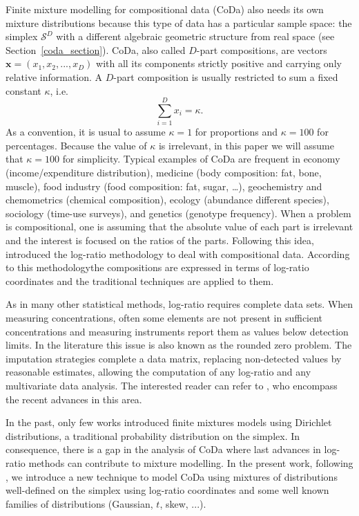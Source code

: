 \documentclass[12pt, a4paper]{article}
\begin{document}
Finite mixture modelling for compositional data (CoDa) also needs its own mixture distributions because this type of data has a particular sample space: the simplex $\mathcal{S}^D$ with a different algebraic geometric structure from real space (see Section~\ref{coda_section}).
CoDa, also called $D$-part compositions, are vectors $\textbf{x} = (x_1, x_2, ..., x_D)$ with all its components strictly positive  and carrying only relative information. A $D$-part composition is usually restricted to sum a fixed constant $\kappa$, i.e.
\begin{equation}
\sum_{i=1 }^D x_i = \kappa.
\label{sum_to_constant}
\end{equation}
As a convention, it is usual to assume $\kappa =1$ for proportions and $\kappa = 100$ for percentages. Because the value of $\kappa$ is irrelevant, in this paper we will assume that $\kappa = 100$ for simplicity. Typical examples of CoDa are frequent in economy (income/expenditure distribution), medicine (body composition: fat, bone, muscle), food industry (food composition: fat, sugar, …), geochemistry and chemometrics (chemical composition), ecology (abundance different species), sociology (time-use surveys), and genetics (genotype frequency). 
When a problem is compositional, one is assuming that the absolute value of each part is irrelevant and the interest is focused on the ratios of the parts. Following this idea, \cite{aitchison1986statistical} introduced the log-ratio methodology to deal with compositional data. According to this methodologythe compositions are expressed in terms of log-ratio coordinates and the traditional techniques are applied to them.

As in many other statistical methods, log-ratio requires complete data sets. When measuring concentrations, often some elements are not present in sufficient concentrations and measuring instruments report them as values below detection limits. In the literature this issue is also known as the rounded zero problem. The imputation strategies complete a data matrix, replacing non-detected values by reasonable estimates, allowing the computation of any log-ratio and any multivariate data analysis. The interested reader can refer to \cite{palarea2014compositional}, who encompass the recent advances in this area.


In the past, only few works \citep[e.g.,][]{albert1982mixtures, bouguila2004unsupervised} introduced finite mixtures models using Dirichlet distributions, a traditional probability distribution on the simplex. In consequence, there is a gap in the analysis of CoDa where last advances in log-ratio methods can contribute to mixture modelling. In the present work, following \cite{mateu2013normal}, we introduce a new technique to model CoDa using mixtures of distributions well-defined on the simplex using log-ratio coordinates and some well known families of distributions (Gaussian, $t$, skew, ...).
\end{document}
